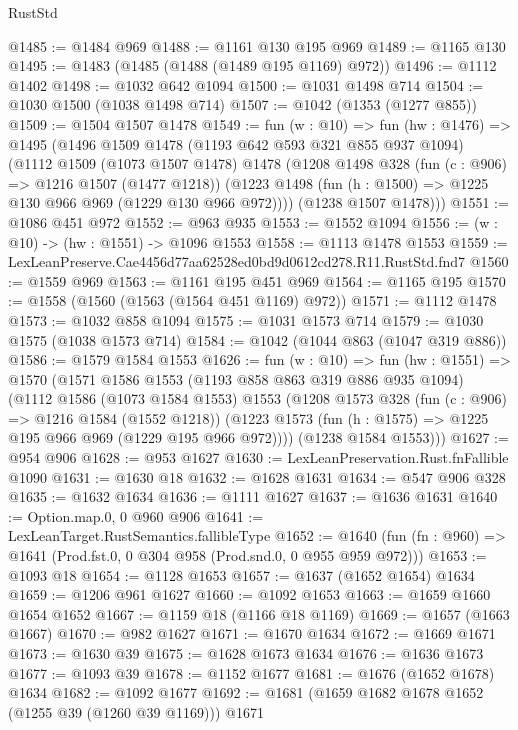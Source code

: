 \begin{lexlean}{RustStd}
\begin{coremodule}
@1485 := @1484 @969
@1488 := @1161 @130 @195 @969
@1489 := @1165 @130
@1495 := @1483 (@1485 (@1488 (@1489 @195 @1169) @972))
@1496 := @1112 @1402
@1498 := @1032 @642 @1094
@1500 := @1031 @1498 @714
@1504 := @1030 @1500 (@1038 @1498 @714)
@1507 := @1042 (@1353 (@1277 @855))
@1509 := @1504 @1507 @1478
@1549 := fun (w : @10) =>
  fun (hw : @1476) =>
  @1495
    (@1496
      @1509
      @1478
      (@1193 @642 @593 @321 @855 @937 @1094)
      (@1112
        @1509
        (@1073 @1507 @1478)
        @1478
        (@1208
          @1498
          @328
          (fun (c : @906) => @1216 @1507 (@1477 @1218))
          (@1223 @1498 (fun (h : @1500) => @1225 @130 @966 @969 (@1229 @130 @966 @972))))
        (@1238 @1507 @1478)))
@1551 := @1086 @451 @972
@1552 := @963 @935
@1553 := @1552 @1094
@1556 := (w : @10) -> (hw : @1551) -> @1096 @1553
@1558 := @1113 @1478 @1553
@1559 := LexLeanPreserve.Cae4456d77aa62528ed0bd9d0612cd278.R11.RustStd.fnd7
@1560 := @1559 @969
@1563 := @1161 @195 @451 @969
@1564 := @1165 @195
@1570 := @1558 (@1560 (@1563 (@1564 @451 @1169) @972))
@1571 := @1112 @1478
@1573 := @1032 @858 @1094
@1575 := @1031 @1573 @714
@1579 := @1030 @1575 (@1038 @1573 @714)
@1584 := @1042 (@1044 @863 (@1047 @319 @886))
@1586 := @1579 @1584 @1553
@1626 := fun (w : @10) =>
  fun (hw : @1551) =>
  @1570
    (@1571
      @1586
      @1553
      (@1193 @858 @863 @319 @886 @935 @1094)
      (@1112
        @1586
        (@1073 @1584 @1553)
        @1553
        (@1208
          @1573
          @328
          (fun (c : @906) => @1216 @1584 (@1552 @1218))
          (@1223 @1573 (fun (h : @1575) => @1225 @195 @966 @969 (@1229 @195 @966 @972))))
        (@1238 @1584 @1553)))
@1627 := @954 @906
@1628 := @953 @1627
@1630 := LexLeanPreservation.Rust.fnFallible @1090
@1631 := @1630 @18
@1632 := @1628 @1631
@1634 := @547 @906 @328
@1635 := @1632 @1634
@1636 := @1111 @1627
@1637 := @1636 @1631
@1640 := Option.map.{0, 0} @960 @906
@1641 := LexLeanTarget.RustSemantics.fallibleType
@1652 := @1640
    (fun (fn : @960) => @1641 (Prod.fst.{0, 0} @304 @958 (Prod.snd.{0, 0} @955 @959 @972)))
@1653 := @1093 @18
@1654 := @1128 @1653
@1657 := @1637 (@1652 @1654) @1634
@1659 := @1206 @961 @1627
@1660 := @1092 @1653
@1663 := @1659 @1660 @1654 @1652
@1667 := @1159 @18 (@1166 @18 @1169)
@1669 := @1657 (@1663 @1667)
@1670 := @982 @1627
@1671 := @1670 @1634
@1672 := @1669 @1671
@1673 := @1630 @39
@1675 := @1628 @1673 @1634
@1676 := @1636 @1673
@1677 := @1093 @39
@1678 := @1152 @1677
@1681 := @1676 (@1652 @1678) @1634
@1682 := @1092 @1677
@1692 := @1681 (@1659 @1682 @1678 @1652 (@1255 @39 (@1260 @39 @1169))) @1671

\end{coremodule}
\end{lexlean}
